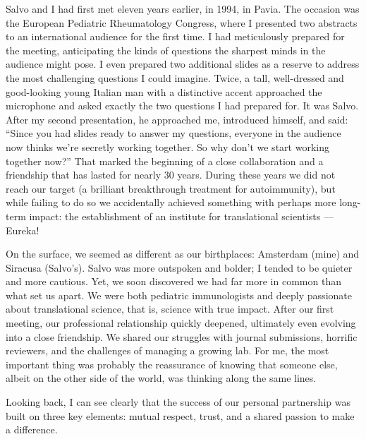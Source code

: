 \documentclass[authordate, editorial]{jote-new-article}
\begin{document}
	Salvo and I had first met eleven years earlier, in 1994, in Pavia. The occasion was the European Pediatric Rheumatology Congress, where I presented two abstracts to an international audience for the first time. I had meticulously prepared for the meeting, anticipating the kinds of questions the sharpest minds in the audience might pose. I even prepared two additional slides as a reserve to address the most challenging questions I could imagine. Twice, a tall, well-dressed and good-looking young Italian man with a distinctive accent approached the microphone and asked exactly the two questions I had prepared for. It was Salvo. After my second presentation, he approached me, introduced himself, and said: “Since you had slides ready to answer my questions, everyone in the audience now thinks we're secretly working together. So why don't we start working together now?” That marked the beginning of a close collaboration and a friendship that has lasted for nearly 30 years. During these years we did not reach our target (a brilliant breakthrough treatment for autoimmunity), but while failing to do so we accidentally achieved something with perhaps more long-term impact: the establishment of an institute for translational scientists — Eureka!







	On the surface, we seemed as different as our birthplaces: Amsterdam (mine) and Siracusa (Salvo's). Salvo was more outspoken and bolder; I tended to be quieter and more cautious. Yet, we soon discovered we had far more in common than what set us apart. We were both pediatric immunologists and deeply passionate about translational science, that is, science with true impact. After our first meeting, our professional relationship quickly deepened, ultimately even evolving into a close friendship. We shared our struggles with journal submissions, horrific reviewers, and the challenges of managing a growing lab. For me, the most important thing was probably the reassurance of knowing that someone else, albeit on the other side of the world, was thinking along the same lines.



	Looking back, I can see clearly that the success of our personal partnership was built on three key elements: mutual respect, trust, and a shared passion to make a difference.
\end{document}
